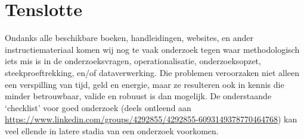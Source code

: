 \documentclass[
]{book}
\begin{document}
\hypertarget{tenslotte}{%
\section{Tenslotte}\label{tenslotte}}

Ondanks alle beschikbare boeken, handleidingen, websites, en ander
instructiemateriaal komen wij nog te vaak onderzoek tegen waar
methodologisch iets mis is in de onderzoeksvragen, operationalisatie,
onderzoeksopzet, steekproeftrekking, en/of dataverwerking. Die problemen
veroorzaken niet alleen een verspilling van tijd, geld en energie, maar
ze resulteren ook in kennis die minder betrouwbaar, valide en robuust is
dan mogelijk. De onderstaande `checklist' voor goed onderzoek (deels
ontleend aan
\url{https://www.linkedin.com/groups/4292855/4292855-6093149378770464768})
kan veel ellende in latere stadia van een onderzoek voorkomen.
\end{document}
